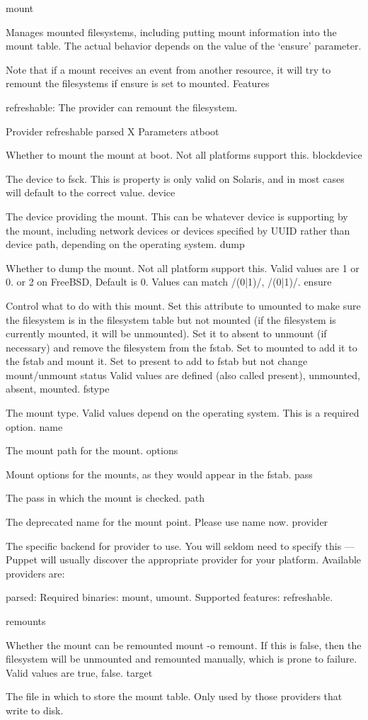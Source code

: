 mount

Manages mounted filesystems, including putting mount information into the mount table. The actual behavior depends on the value of the ‘ensure’ parameter.

Note that if a mount receives an event from another resource, it will try to remount the filesystems if ensure is set to mounted.
Features

    refreshable: The provider can remount the filesystem.

Provider 	refreshable
parsed 	X
Parameters
atboot

Whether to mount the mount at boot. Not all platforms support this.
blockdevice

The device to fsck. This is property is only valid on Solaris, and in most cases will default to the correct value.
device

The device providing the mount. This can be whatever device is supporting by the mount, including network devices or devices specified by UUID rather than device path, depending on the operating system.
dump

Whether to dump the mount. Not all platform support this. Valid values are 1 or 0. or 2 on FreeBSD, Default is 0. Values can match /(0|1)/, /(0|1)/.
ensure

Control what to do with this mount. Set this attribute to umounted to make sure the filesystem is in the filesystem table but not mounted (if the filesystem is currently mounted, it will be unmounted). Set it to absent to unmount (if necessary) and remove the filesystem from the fstab. Set to mounted to add it to the fstab and mount it. Set to present to add to fstab but not change mount/unmount status Valid values are defined (also called present), unmounted, absent, mounted.
fstype

The mount type. Valid values depend on the operating system. This is a required option.
name

The mount path for the mount.
options

Mount options for the mounts, as they would appear in the fstab.
pass

The pass in which the mount is checked.
path

The deprecated name for the mount point. Please use name now.
provider

The specific backend for provider to use. You will seldom need to specify this — Puppet will usually discover the appropriate provider for your platform. Available providers are:

    parsed: Required binaries: mount, umount. Supported features: refreshable.

remounts

Whether the mount can be remounted mount -o remount. If this is false, then the filesystem will be unmounted and remounted manually, which is prone to failure. Valid values are true, false.
target

The file in which to store the mount table. Only used by those providers that write to disk.
